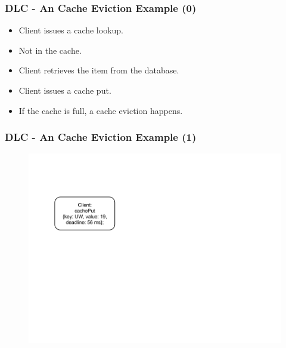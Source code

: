 \documentclass{beamer}
\begin{document}
\begin{frame}
  \frametitle{DLC - An Cache Eviction Example (0)}
  \begin{itemize}
  \item Client issues a cache lookup.
  \item Not in the cache.
  \item Client retrieves the item from the database.
  \item Client issues a cache put.
  \item If the cache is full, a cache eviction happens.
  \end{itemize}
\end{frame}

\begin{frame}
  \frametitle{DLC - An Cache Eviction Example (1)}
  \begin{figure}
    \begin{center}
      \centerline{\includegraphics[scale=0.33]{img/DLC_NEW_1.png}}
    \end{center}
  \end{figure}
\end{frame}
\end{document}
